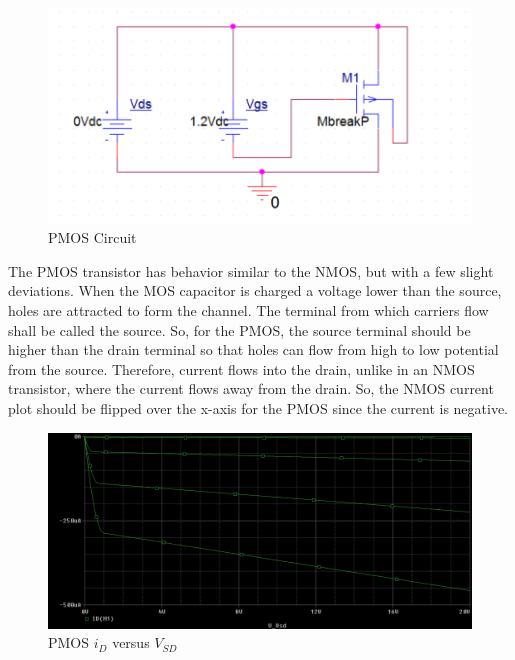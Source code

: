 \FloatBarrier

\begin{figure}[h!]
	\centering
	\includegraphics[scale=0.75]{./images/circuit2.PNG}
	\caption{PMOS Circuit}
	\label{fig:circuit2}
\end{figure}

\FloatBarrier

The PMOS transistor has behavior similar to the NMOS, but with a few slight deviations. When the MOS capacitor is charged a voltage lower than the source, holes are attracted to form the channel. The terminal from which carriers flow shall be called the source. So, for the PMOS, the source terminal should be higher than the drain terminal so that holes can flow from high to low potential from the source. Therefore, current flows into the drain, unlike in an NMOS transistor, where the current flows away from the drain. So, the NMOS current plot should be flipped over the x-axis for the PMOS since the current is negative.

\FloatBarrier

\begin{figure}[h!]
	\centering
	\includegraphics[scale=0.75]{./images/circuit2_vsd_sweep.PNG}
	\caption{PMOS $i_{D}$ versus $V_{SD}$}
	\label{fig:circuit2_vsd_sweep}
\end{figure}

